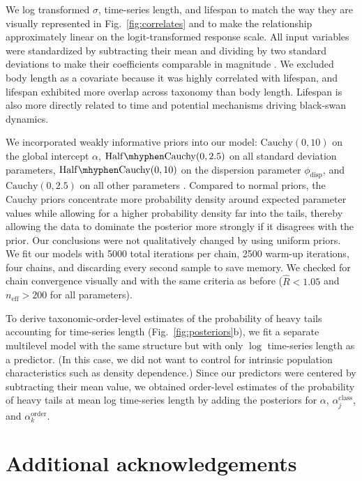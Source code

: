 We log transformed $\sigma$, time-series length, and lifespan to match the way they are visually represented in Fig.~\ref{fig:correlates} and to make the relationship approximately linear on the logit-transformed response scale. All input variables were standardized by subtracting their mean and dividing by two standard deviations to make their coefficients comparable in magnitude \citep{gelman2008c}. We excluded body length as a covariate because it was highly correlated with lifespan, and lifespan exhibited more overlap across taxonomy than body length. Lifespan is also more directly related to time and potential mechanisms driving black-swan dynamics.

We incorporated weakly informative priors into our model: $\mathrm{Cauchy}(0, 10)$ on the global intercept $\alpha$, $\mathrm{Half\mhyphen Cauchy}(0, 2.5)$ on all standard deviation parameters, $\mathrm{Half\mhyphen Cauchy}(0, 10)$ on the dispersion parameter $\phi_\mathrm{disp}$, and $\mathrm{Cauchy}(0, 2.5)$ on all other parameters \citep{gelman2006c, gelman2008d}. Compared to normal priors, the Cauchy priors concentrate more probability density around expected parameter values while allowing for a higher probability density far into the tails, thereby allowing the data to dominate the posterior more strongly if it disagrees with the prior. Our conclusions were not qualitatively changed by using uniform priors. We fit our models with 5000 total iterations per chain, 2500 warm-up iterations, four chains, and discarding every second sample to save memory. We checked for chain convergence visually and with the same criteria as before ($\widehat{R} < 1.05$ and $n_\mathrm{eff} >200$ for all parameters).

To derive taxonomic-order-level estimates of the probability of heavy tails accounting for time-series length (Fig.~\ref{fig:posteriors}b), we fit a separate multilevel model with the same structure but with only $\log$ time-series length as a predictor. (In this case, we did not want to control for intrinsic population characteristics such as density dependence.) Since our predictors were centered by subtracting their mean value, we obtained order-level estimates of the probability of heavy tails at mean log time-series length by adding the posteriors for $\alpha$, $\alpha^\mathrm{class}_j$, and $\alpha^\mathrm{order}_k$.

\section{Additional acknowledgements}

